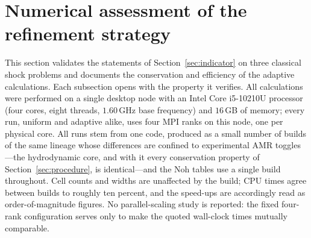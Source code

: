\documentclass[a4paper]{cas-sc}
\begin{document}

\section{Numerical assessment of the refinement strategy}
\label{sec:numerics}

This section validates the statements of Section~\ref{sec:indicator} on three classical shock problems and documents the conservation and efficiency of the adaptive calculations. Each subsection opens with the property it verifies.
All calculations were performed on a single desktop node with an Intel Core i5-10210U processor (four cores, eight threads, $1.60$\,GHz base frequency) and $16$\,GB of memory; every run, uniform and adaptive alike, uses four MPI ranks on this node, one per physical core. All runs stem from one code, produced as a small number of builds of the same lineage whose differences are confined to experimental AMR toggles---the hydrodynamic core, and with it every conservation property of Section~\ref{sec:procedure}, is identical---and the Noh tables use a single build throughout. Cell counts and widths are unaffected by the build; CPU times agree between builds to roughly ten percent, and the speed-ups are accordingly read as order-of-magnitude figures. No parallel-scaling study is reported: the fixed four-rank configuration serves only to make the quoted wall-clock times mutually comparable. %
\end{document}
